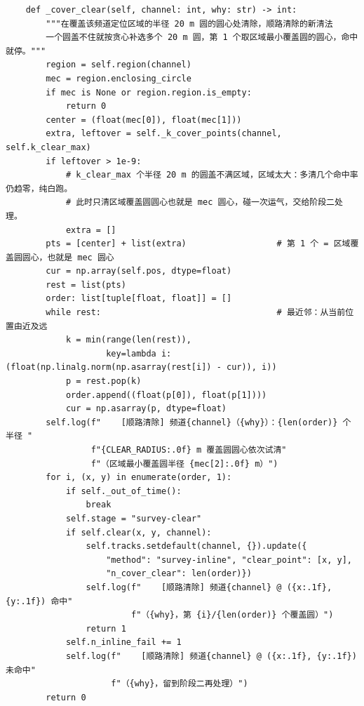 \documentclass[UTF8, zihao=5,AutoFakeBold=2]{ctexart}
\begin{document}
\begin{lstlisting}
    def _cover_clear(self, channel: int, why: str) -> int:
        """在覆盖该频道定位区域的半径 20 m 圆的圆心处清除，顺路清除的新清法
        一个圆盖不住就按贪心补选多个 20 m 圆，第 1 个取区域最小覆盖圆的圆心，命中就停。"""
        region = self.region(channel)
        mec = region.enclosing_circle
        if mec is None or region.region.is_empty:
            return 0
        center = (float(mec[0]), float(mec[1]))
        extra, leftover = self._k_cover_points(channel, self.k_clear_max)
        if leftover > 1e-9:
            # k_clear_max 个半径 20 m 的圆盖不满区域，区域太大：多清几个命中率仍趋零，纯白跑。
            # 此时只清区域覆盖圆圆心也就是 mec 圆心，碰一次运气，交给阶段二处理。
            extra = []
        pts = [center] + list(extra)                  # 第 1 个 = 区域覆盖圆圆心，也就是 mec 圆心
        cur = np.array(self.pos, dtype=float)
        rest = list(pts)
        order: list[tuple[float, float]] = []
        while rest:                                   # 最近邻：从当前位置由近及远
            k = min(range(len(rest)),
                    key=lambda i: (float(np.linalg.norm(np.asarray(rest[i]) - cur)), i))
            p = rest.pop(k)
            order.append((float(p[0]), float(p[1])))
            cur = np.asarray(p, dtype=float)
        self.log(f"    [顺路清除] 频道{channel}（{why}）：{len(order)} 个半径 "
                 f"{CLEAR_RADIUS:.0f} m 覆盖圆圆心依次试清"
                 f"（区域最小覆盖圆半径 {mec[2]:.0f} m）")
        for i, (x, y) in enumerate(order, 1):
            if self._out_of_time():
                break
            self.stage = "survey-clear"
            if self.clear(x, y, channel):
                self.tracks.setdefault(channel, {}).update({
                    "method": "survey-inline", "clear_point": [x, y],
                    "n_cover_clear": len(order)})
                self.log(f"    [顺路清除] 频道{channel} @ ({x:.1f}, {y:.1f}) 命中"
                         f"（{why}，第 {i}/{len(order)} 个覆盖圆）")
                return 1
            self.n_inline_fail += 1
            self.log(f"    [顺路清除] 频道{channel} @ ({x:.1f}, {y:.1f}) 未命中"
                     f"（{why}，留到阶段二再处理）")
        return 0


\end{lstlisting}
\end{document}
